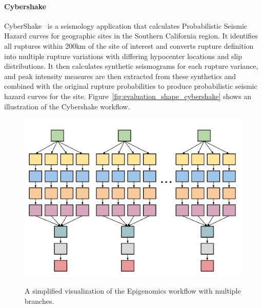 \documentclass{IOS-Book-Article}
\begin{document}
\paragraph{\textbf{Cybershake}}
CyberShake~\cite{Graves2010} is a seismology application that calculates Probabilistic Seismic Hazard curves for geographic sites in the Southern California region. It identifies all ruptures within 200km of the site of interest and converts rupture definition into multiple rupture variations with differing hypocenter locations and slip distributions. It then calculates synthetic seismograms for each rupture variance, and peak intensity measures are then extracted from these synthetics and combined with the original rupture probabilities to produce probabilistic seismic hazard curves for the site. Figure~\ref{fig:evaluation_shape_cybershake} shows an illustration of the Cybershake workflow.

\begin{figure}[htb]
	\centering
	\includegraphics[width=0.8\linewidth]{genome_shape.pdf} \\
	\caption{A simplified visualization of the Epigenomics workflow with multiple branches.}
	\label{fig:evaluation_shape_genome}
\end{figure}
\end{document}
